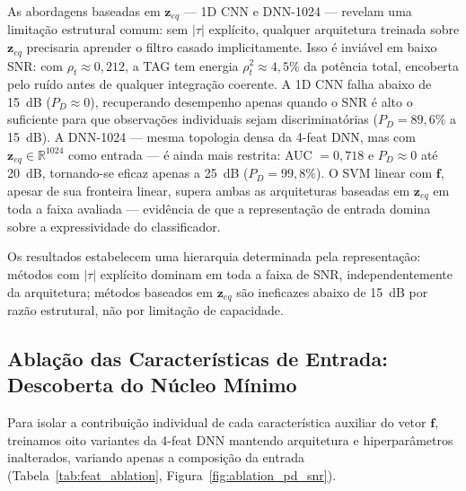 \documentclass{sbrt}
\begin{document}
As abordagens baseadas em $\mathbf{z}_{eq}$ — 1D CNN e DNN-1024 — revelam uma limitação estrutural comum: sem $|\tau|$ explícito, qualquer arquitetura treinada sobre $\mathbf{z}_{eq}$ precisaria aprender o filtro casado implicitamente. Isso é inviável em baixo SNR: com $\rho_t \approx 0{,}212$, a TAG tem energia $\rho_t^2 \approx 4{,}5\%$ da potência total, encoberta pelo ruído antes de qualquer integração coerente. A 1D CNN falha abaixo de 15~dB ($P_D \approx 0$), recuperando desempenho apenas quando o SNR é alto o suficiente para que observações individuais sejam discriminatórias ($P_D = 89{,}6\%$ a 15~dB). A DNN-1024 — mesma topologia densa da 4-feat DNN, mas com $\mathbf{z}_{eq} \in \mathbb{R}^{1024}$ como entrada — é ainda mais restrita: AUC $= 0{,}718$ e $P_D \approx 0$ até 20~dB, tornando-se eficaz apenas a 25~dB ($P_D = 99{,}8\%$). O SVM linear com $\mathbf{f}$, apesar de sua fronteira linear, supera ambas as arquiteturas baseadas em $\mathbf{z}_{eq}$ em toda a faixa avaliada — evidência de que a representação de entrada domina sobre a expressividade do classificador.

Os resultados estabelecem uma hierarquia determinada pela representação: métodos com $|\tau|$ explícito dominam em toda a faixa de SNR, independentemente da arquitetura; métodos baseados em $\mathbf{z}_{eq}$ são ineficazes abaixo de 15~dB por razão estrutural, não por limitação de capacidade.

\subsection{Ablação das Características de Entrada: Descoberta do Núcleo Mínimo}

Para isolar a contribuição individual de cada característica auxiliar do vetor $\mathbf{f}$, treinamos oito variantes da 4-feat DNN mantendo arquitetura e hiperparâmetros inalterados, variando apenas a composição da entrada (Tabela~\ref{tab:feat_ablation}, Figura~\ref{fig:ablation_pd_snr}).
\end{document}
